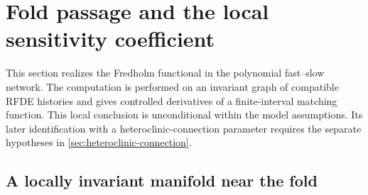 \section{Fold passage and the local sensitivity coefficient}
\label{sec:fold-passage}

This section realizes the Fredholm functional in the polynomial fast--slow
network.  The computation is performed on an invariant graph of compatible
RFDE histories and gives controlled derivatives of a finite-interval
matching function.  This local conclusion is unconditional within the model
assumptions.  Its later identification with a heteroclinic-connection
parameter requires the separate hypotheses in
\cref{sec:heteroclinic-connection}.

\subsection{A locally invariant manifold near the fold}

